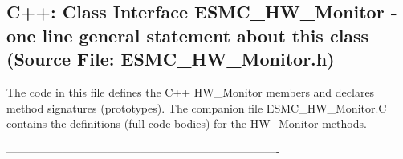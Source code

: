  
\parskip        0pt
\parindent      0pt
\baselineskip  11pt
 
\def\bv{\begin{verbatim}}
\def\ev{\end{verbatim}}
\def\be{\begin{equation}}
\def\ee{\end{equation}}
\def\bea{\begin{eqnarray}}
\def\eea{\end{eqnarray}}
\def\bi{\begin{itemize}}
\def\ei{\end{itemize}}
\def\bn{\begin{enumerate}}
\def\en{\end{enumerate}}
\def\bd{\begin{description}}
\def\ed{\end{description}}
\def\({\left (}
\def\){\right )}
\def\[{\left [}
\def\]{\right ]}
\def\<{\left  \langle}
\def\>{\right \rangle}
\def\cI{{\cal I}}
\def\diag{\mathop{\rm diag}}
\def\tr{\mathop{\rm tr}}


 
\subsection{C++:  Class Interface ESMC\_HW\_Monitor - one line general statement about this class (Source File: ESMC\_HW\_Monitor.h)}


  
  
   The code in this file defines the C++ HW_Monitor members and declares method 
   signatures (prototypes).  The companion file ESMC_HW_Monitor.C contains
   the definitions (full code bodies) for the HW_Monitor methods.
  
   
  
  -------------------------------------------------------------------------
   
